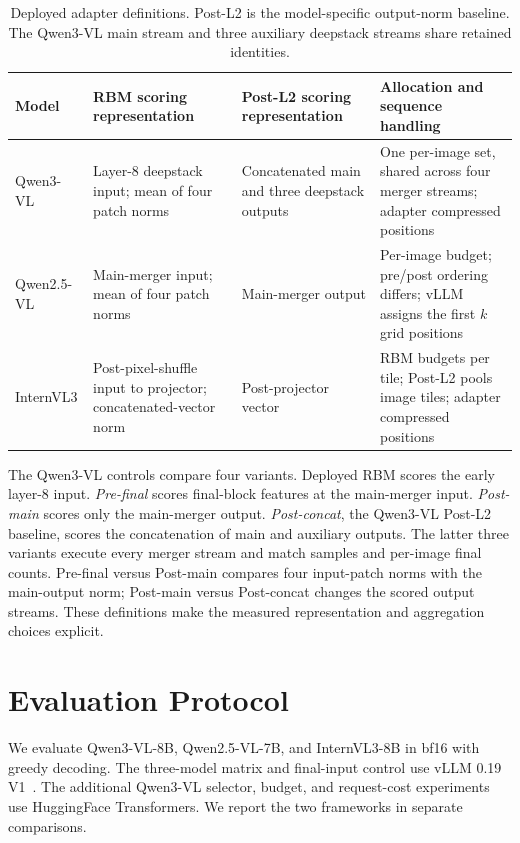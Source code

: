 \documentclass[10pt,twocolumn,letterpaper]{article}
\begin{document}
\begin{table}[t]
\centering
\caption{\label{tab:adapters}Deployed adapter definitions. Post-L2 is the model-specific output-norm baseline. The Qwen3-VL main stream and three auxiliary deepstack streams share retained identities.}
\small
\begin{tabular}{@{}p{}p{}p{}p{}@{}}
\toprule
Model & RBM scoring representation & Post-L2 scoring representation & Allocation and sequence handling\\
\midrule
Qwen3-VL & Layer-8 deepstack input; mean of four patch norms & Concatenated main and three deepstack outputs & One per-image set, shared across four merger streams; adapter compressed positions\\
Qwen2.5-VL & Main-merger input; mean of four patch norms & Main-merger output & Per-image budget; pre/post ordering differs; vLLM assigns the first $k$ grid positions\\
InternVL3 & Post-pixel-shuffle input to projector; concatenated-vector norm & Post-projector vector & RBM budgets per tile; Post-L2 pools image tiles; adapter compressed positions\\
\bottomrule
\end{tabular}
\end{table}

The Qwen3-VL controls compare four variants. Deployed RBM scores the early layer-8 input. \emph{Pre-final} scores final-block features at the main-merger input. \emph{Post-main} scores only the main-merger output. \emph{Post-concat}, the Qwen3-VL Post-L2 baseline, scores the concatenation of main and auxiliary outputs. The latter three variants execute every merger stream and match samples and per-image final counts. Pre-final versus Post-main compares four input-patch norms with the main-output norm; Post-main versus Post-concat changes the scored output streams. These definitions make the measured representation and aggregation choices explicit.

\section{Evaluation Protocol}
We evaluate Qwen3-VL-8B, Qwen2.5-VL-7B, and InternVL3-8B in bf16 with greedy decoding. The three-model matrix and final-input control use vLLM 0.19 V1~\cite{kwon2023vllm}. The additional Qwen3-VL selector, budget, and request-cost experiments use HuggingFace Transformers. We report the two frameworks in separate comparisons.
\end{document}
